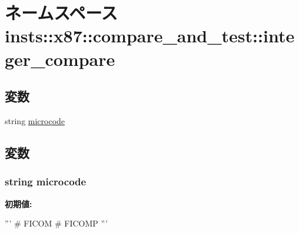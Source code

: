 \hypertarget{namespaceinsts_1_1x87_1_1compare__and__test_1_1integer__compare}{
\section{ネームスペース insts::x87::compare\_\-and\_\-test::integer\_\-compare}
\label{namespaceinsts_1_1x87_1_1compare__and__test_1_1integer__compare}
}
\subsection*{変数}
\begin{DoxyCompactItemize}
\item 
string \hyperlink{namespaceinsts_1_1x87_1_1compare__and__test_1_1integer__compare_a770f11a173e99389a8802f0107ed8f52}{microcode}
\end{DoxyCompactItemize}


\subsection{変数}
\hypertarget{namespaceinsts_1_1x87_1_1compare__and__test_1_1integer__compare_a770f11a173e99389a8802f0107ed8f52}{
\subsubsection[{microcode}]{\setlength{\rightskip}{0pt plus 5cm}string {\bf microcode}}}
\label{namespaceinsts_1_1x87_1_1compare__and__test_1_1integer__compare_a770f11a173e99389a8802f0107ed8f52}
{\bfseries 初期値:}
\begin{DoxyCode}
'''
# FICOM
# FICOMP
'''
\end{DoxyCode}
